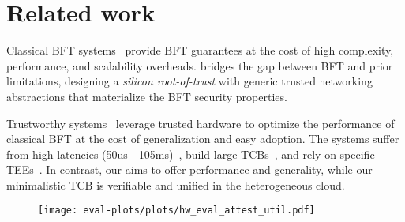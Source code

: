 \section{Related work}

 Classical BFT systems~\cite{Castro:2002, Suri_Payer_2021, DBLP:journals/corr/abs-1803-05069, Chan2018PaLaAS, DBLP:journals/corr/abs-1807-04938, Chan2018PiLiAE, bft-smart, 6681599} provide BFT guarantees at the cost of high complexity, performance, and scalability overheads. \projecttitle{} bridges the gap between BFT and prior limitations, designing a {\em silicon root-of-trust} with generic trusted networking abstractions that materialize the BFT security properties.

 Trustworthy systems~\cite{10.1145/3492321.3519568, minBFT, 10.1145/3552326.3587455, 10.1145/3492321.3519568, treaty, avocado, ccf} leverage trusted hardware to optimize the performance of classical BFT at the cost of generalization and easy adoption. The systems suffer from high latencies (50us---105ms)~\cite{levin2009trinc, 10.1145/2168836.2168866}, build large TCBs~\cite{treaty, avocado}, and rely on specific TEEs~\cite{minBFT, hybster}. In contrast, our \projecttitle{} aims to offer performance and generality, while our minimalistic TCB is verifiable and unified in the heterogeneous cloud. 

\begin{figure}
    \centering
    \texttt{[image: eval-plots/plots/hw\_eval\_attest\_util.pdf]}
    \vspace{-10pt}
  \caption{ }
    \label{fig:scalability}
\end{figure}

